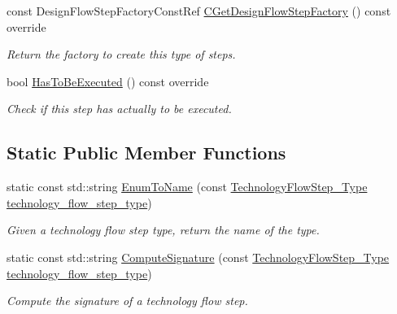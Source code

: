 \begin{DoxyCompactItemize}
const Design\+Flow\+Step\+Factory\+Const\+Ref \hyperlink{classTechnologyFlowStep_a10c1c680300843016dfcd692831845d0}{C\+Get\+Design\+Flow\+Step\+Factory} () const override
\begin{DoxyCompactList}\small\item\em Return the factory to create this type of steps. \end{DoxyCompactList}\item 
bool \hyperlink{classTechnologyFlowStep_a615857428a91ec31e8b9f45cbdeeaa36}{Has\+To\+Be\+Executed} () const override
\begin{DoxyCompactList}\small\item\em Check if this step has actually to be executed. \end{DoxyCompactList}\end{DoxyCompactItemize}
\subsection*{Static Public Member Functions}
\begin{DoxyCompactItemize}
\item 
static const std\+::string \hyperlink{classTechnologyFlowStep_addcc035c454c244798b6d260b35eeae7}{Enum\+To\+Name} (const \hyperlink{technology__flow__step_8hpp_a65208cfec963a7d7def292f9db428292}{Technology\+Flow\+Step\+\_\+\+Type} \hyperlink{classTechnologyFlowStep_a599a03a1ab1c3a71f3ac3bfbaed868b4}{technology\+\_\+flow\+\_\+step\+\_\+type})
\begin{DoxyCompactList}\small\item\em Given a technology flow step type, return the name of the type. \end{DoxyCompactList}\item 
static const std\+::string \hyperlink{classTechnologyFlowStep_a404a56f6775e683963f57892e0bf7b0a}{Compute\+Signature} (const \hyperlink{technology__flow__step_8hpp_a65208cfec963a7d7def292f9db428292}{Technology\+Flow\+Step\+\_\+\+Type} \hyperlink{classTechnologyFlowStep_a599a03a1ab1c3a71f3ac3bfbaed868b4}{technology\+\_\+flow\+\_\+step\+\_\+type})
\begin{DoxyCompactList}\small\item\em Compute the signature of a technology flow step. \end{DoxyCompactList}\end{DoxyCompactItemize}
